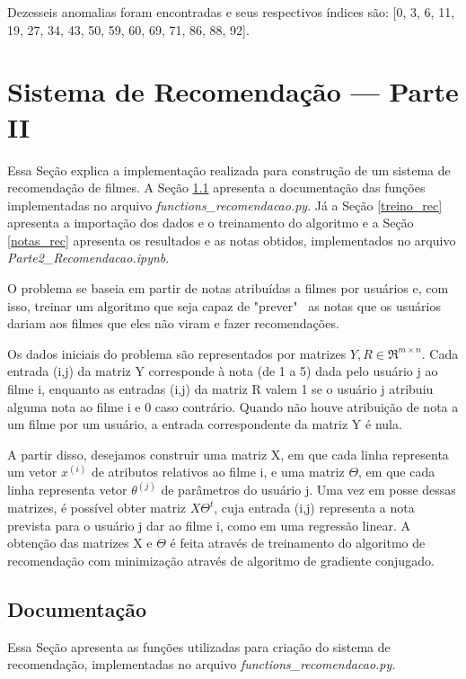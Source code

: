 \documentclass[12pt]{article}
\begin{document}
Dezesseis anomalias foram encontradas e seus respectivos índices são: [0, 3, 6, 11, 19, 27, 34, 43, 50, 59, 60, 69, 71, 86, 88, 92].


\section{Sistema de Recomendação --- Parte II} \label{parte2}

Essa Seção explica a implementação realizada para construção de um sistema de recomendação de filmes. A Seção \ref{doc_rec} apresenta a documentação das funções implementadas no arquivo \textit{functions\_recomendacao.py}. Já a Seção \ref{treino_rec} apresenta a importação dos dados e o treinamento do algoritmo e a Seção \ref{notas_rec} apresenta os resultados e as notas obtidos, implementados no arquivo \textit{Parte2\_Recomendacao.ipynb}.

O problema se baseia em partir de notas atribuídas a filmes por usuários e, com isso, treinar um algoritmo que seja capaz de "prever" \ as notas que os usuários dariam aos filmes que eles não viram e fazer recomendações.

Os dados iniciais do problema são representados por matrizes $Y, R \in \Re^{m \times n}$. Cada entrada (i,j) da matriz Y corresponde à nota (de 1 a 5) dada pelo usuário j ao filme i, enquanto as entradas (i,j) da matriz R valem 1 se o usuário j atribuiu alguma nota ao filme i e 0 caso contrário. Quando não houve atribuição de nota a um filme por um usuário, a entrada correspondente da matriz Y é nula.

A partir disso, desejamos construir uma matriz X, em que cada linha representa um vetor $x^{(i)}$ de atributos relativos ao filme i, e uma matriz $\Theta$, em que cada linha representa vetor $\theta^{(j)}$ de parâmetros do usuário j. Uma vez em posse dessas matrizes, é possível obter matriz $X\Theta^t$, cuja entrada (i,j) representa a nota prevista para o usuário j dar ao filme i, como em uma regressão linear. A obtenção das matrizes X e $\Theta$ é feita através de treinamento do algoritmo de recomendação com minimização através de algoritmo de gradiente conjugado.

\subsection{Documentação} \label{doc_rec}
Essa Seção apresenta as funções utilizadas para criação do sistema de recomendação, implementadas no arquivo \textit{functions\_recomendacao.py.}
\end{document}
